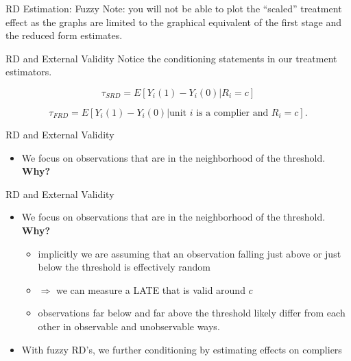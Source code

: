 \documentclass[
  ignorenonframetext,
]{beamer}
\providecommand{\tightlist}{%
  \setlength{\itemsep}{0pt}\setlength{\parskip}{0pt}}
\begin{document}
\begin{frame}{RD Estimation: Fuzzy}
\protect\hypertarget{rd-estimation-fuzzy-5}{}
Note: you will not be able to plot the ``scaled'' treatment effect as
the graphs are limited to the graphical equivalent of the first stage
and the reduced form estimates.
\end{frame}

\begin{frame}{RD and External Validity}
\protect\hypertarget{rd-and-external-validity}{}
Notice the conditioning statements in our treatment estimators.

\[
\tau_{SRD}=E[Y_i(1)-Y_i(0)|R_i=c]
\]

\[
\tau_{FRD}=E[Y_i(1)-Y_i(0)|\text{unit }i\text{ is a complier and } R_i=c]. 
\]
\end{frame}

\begin{frame}{RD and External Validity}
\protect\hypertarget{rd-and-external-validity-1}{}
\begin{itemize}
\tightlist
\item
  We focus on observations that are in the neighborhood of the
  threshold. \textbf{Why?}
\end{itemize}
\end{frame}

\begin{frame}{RD and External Validity}
\protect\hypertarget{rd-and-external-validity-2}{}
\begin{itemize}
\tightlist
\item
  We focus on observations that are in the neighborhood of the
  threshold. \textbf{Why?}

  \begin{itemize}
  \tightlist
  \item
    implicitly we are assuming that an observation falling just above or
    just below the threshold is effectively random
  \item
    \(\Rightarrow\) we can measure a LATE that is valid around \(c\)
  \item
    observations far below and far above the threshold likely differ
    from each other in observable and unobservable ways.
  \end{itemize}
\item
  With fuzzy RD's, we further conditioning by estimating effects on
  compliers
\end{itemize}
\end{frame}
\end{document}
